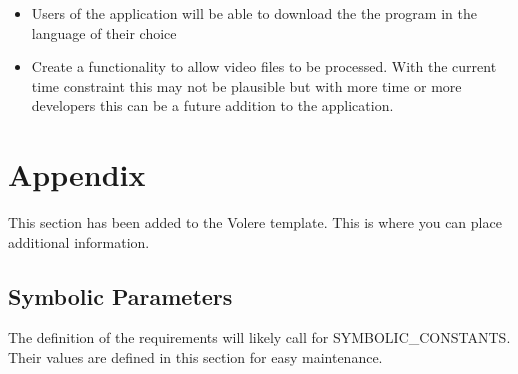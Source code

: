 \documentclass[12pt, titlepage]{article}
\begin{document}
\begin{itemize}
\item Users of the application will be able to download the the program in the language of their choice
\item Create a functionality to allow video files to be processed. With the current time constraint this may not be plausible but with more time or more developers this can be a future addition to the application.
\end{itemize}






\newpage

\section{Appendix}

This section has been added to the Volere template.  This is where you can place
additional information.

\subsection{Symbolic Parameters}

The definition of the requirements will likely call for SYMBOLIC\_CONSTANTS.
Their values are defined in this section for easy maintenance.
\end{document}
